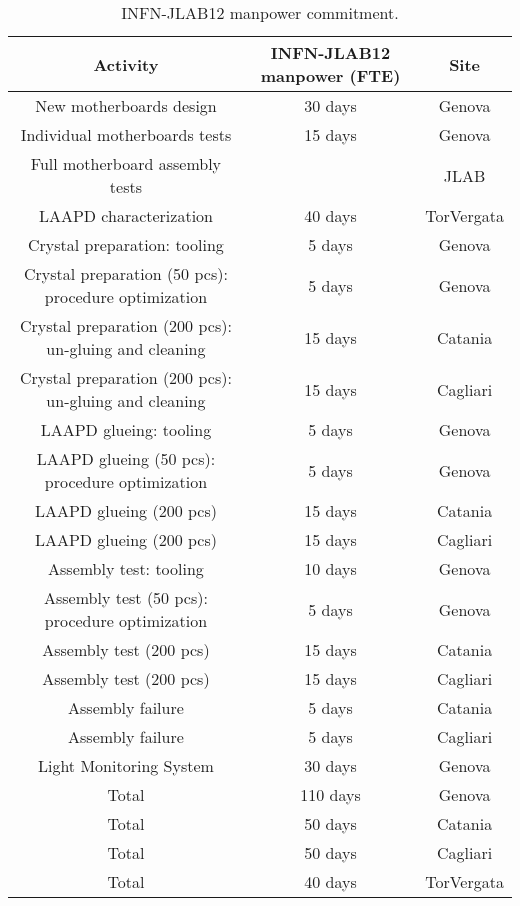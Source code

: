 \documentclass[11pt]{report}
\begin{document}
\begin{table}[htdp]
\caption{INFN-JLAB12 manpower commitment.}
\begin{center}
\begin{tabular}{|c|c|c|}
\hline
Activity & INFN-JLAB12
 manpower (FTE) & Site\\
\hline\hline
New motherboards design & 30 days & Genova\\
\hline
Individual motherboards tests & 15 days  & Genova\\
\hline
Full motherboard assembly tests &  & JLAB\\
\hline
\hline
LAAPD characterization& 40 days  & TorVergata\\
\hline
\hline
Crystal preparation: tooling & 5 days  & Genova\\
\hline
Crystal preparation (50 pcs): procedure optimization & 5 days  & Genova\\
\hline
Crystal preparation (200 pcs): un-gluing and cleaning & 15 days  & Catania\\
\hline
Crystal preparation (200 pcs): un-gluing and cleaning & 15 days  & Cagliari\\
\hline
LAAPD glueing: tooling & 5 days  & Genova\\
\hline
LAAPD glueing (50 pcs): procedure optimization & 5 days  & Genova\\
\hline
LAAPD glueing (200 pcs)& 15 days  & Catania\\
\hline
LAAPD glueing (200 pcs)  & 15 days  & Cagliari\\
\hline
Assembly test: tooling & 10 days  & Genova\\
\hline
Assembly test (50 pcs): procedure optimization & 5 days  & Genova\\
\hline
Assembly test (200 pcs)&  15 days  & Catania\\
\hline
Assembly test (200 pcs)  & 15 days  & Cagliari\\
\hline
Assembly failure&  5 days  & Catania\\
\hline
Assembly failure & 5 days  & Cagliari\\
\hline
\hline
Light Monitoring System & 30 days  & Genova\\
\hline
\hline
\hline
Total&    110 days &Genova \\
\hline
Total&    50 days &Catania \\
\hline
Total&    50 days &Cagliari\\
\hline
Total&    40 days &TorVergata\\
\hline
\hline
\end{tabular}
\end{center}
\label{tb:infn_ts}
\end{table}%
\end{document}
